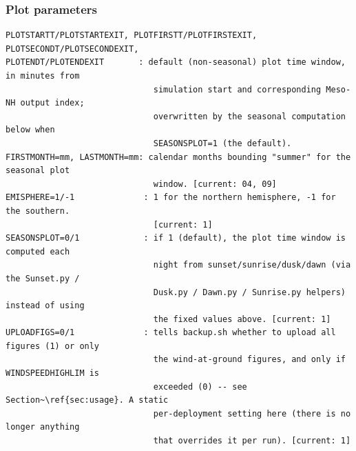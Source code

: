 \subsubsection{Plot parameters}
\begin{lstlisting}
PLOTSTARTT/PLOTSTARTEXIT, PLOTFIRSTT/PLOTFIRSTEXIT, PLOTSECONDT/PLOTSECONDEXIT,
PLOTENDT/PLOTENDEXIT       : default (non-seasonal) plot time window, in minutes from
                              simulation start and corresponding Meso-NH output index;
                              overwritten by the seasonal computation below when
                              SEASONSPLOT=1 (the default).
FIRSTMONTH=mm, LASTMONTH=mm: calendar months bounding "summer" for the seasonal plot
                              window. [current: 04, 09]
EMISPHERE=1/-1              : 1 for the northern hemisphere, -1 for the southern.
                              [current: 1]
SEASONSPLOT=0/1             : if 1 (default), the plot time window is computed each
                              night from sunset/sunrise/dusk/dawn (via the Sunset.py /
                              Dusk.py / Dawn.py / Sunrise.py helpers) instead of using
                              the fixed values above. [current: 1]
UPLOADFIGS=0/1              : tells backup.sh whether to upload all figures (1) or only
                              the wind-at-ground figures, and only if WINDSPEEDHIGHLIM is
                              exceeded (0) -- see Section~\ref{sec:usage}. A static
                              per-deployment setting here (there is no longer anything
                              that overrides it per run). [current: 1]
\end{lstlisting}
